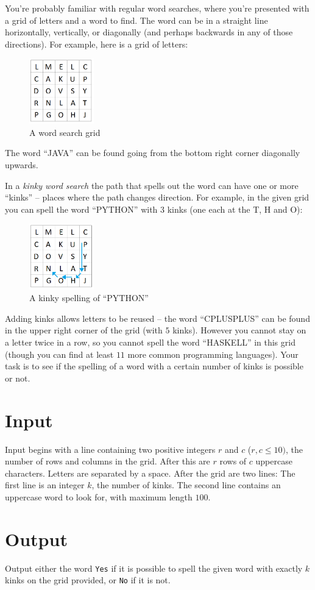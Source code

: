 \documentclass{article}
\begin{document}
You're probably familiar with regular word searches, where you're presented with a grid of letters and a word to find.  The word can be in a straight line horizontally, vertically, or diagonally (and perhaps backwards in any of those directions).  For example, here is a grid of letters:

\begin{figure}[!h]
\centering
\includegraphics[width=0.25\textwidth]{kinky1.png}
\caption{A word search grid}
\end{figure}

The word ``JAVA'' can be found going from the bottom right corner diagonally upwards.

In a {\em kinky word search\/} the path that spells out the word can have one or more ``kinks'' -- places where the path changes direction.  For example, in the given grid you can spell the word ``PYTHON'' with $3$ kinks (one each at the T, H and  O):

\begin{figure}[!h]
\centering
\includegraphics[width=0.25\textwidth]{kinky2.png}
\caption{A kinky spelling of ``PYTHON''}
\end{figure}

Adding kinks allows letters to be reused -- the word ``CPLUSPLUS'' can be found in the upper right corner of the grid (with $5$ kinks).  However you cannot stay on a letter twice in a row, so you cannot spell the word ``HASKELL'' in this grid (though you can find at least $11$ more common programming languages).
Your task is to see if the spelling of a word with a certain number of kinks is possible or not.

\section*{Input}
Input begins with a line containing two positive integers $r$ and $c$ ($r, c \leq 10)$, the number of rows and columns in the grid.  After this are $r$ rows of $c$ uppercase characters.  Letters are separated by a space. After the grid are two lines: The first line is an integer $k$, the number of kinks.  The second line contains an uppercase word to look for, with maximum length $100$.

\section*{Output}

Output either the word {\tt Yes} if it is possible to spell the given word with exactly $k$ kinks on the grid provided, or {\tt No} if it is not.
\end{document}
